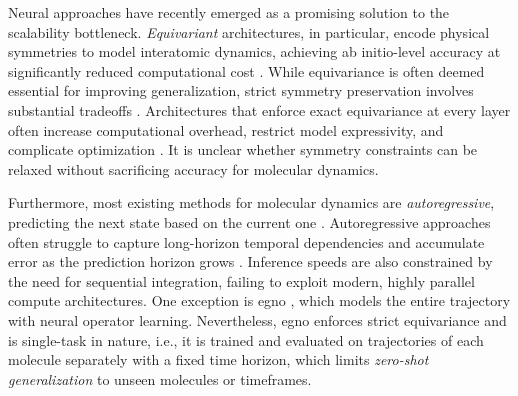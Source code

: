 Neural approaches have recently emerged as a promising solution to the scalability bottleneck. \textit{Equivariant} architectures, in particular, encode physical symmetries to model interatomic dynamics, achieving ab initio-level accuracy at significantly reduced computational cost  \cite{batzner_e3-equivariant_2022, musaelian_learning_2022, batatia_design_2022, batatia_mace_2023, xu_equivariant_2024}. While equivariance is often deemed essential for improving generalization, strict symmetry preservation involves substantial tradeoffs \cite{xu_equivariant_2024, schreiner_implicit_2023}. Architectures that enforce exact equivariance at every layer often increase computational overhead, restrict model expressivity, and complicate optimization \cite{fuchs_se3-transformers_2020, brehmer_geometric_2023, elhag_relaxed_2025}. It is unclear whether symmetry constraints can be relaxed without sacrificing accuracy for molecular dynamics.

Furthermore, most existing methods for molecular dynamics are \textit{autoregressive}, predicting the next state based on the current one \citep{kohler_equivariant_2019,fuchs_se3-transformers_2020,thiemann2025force}.  Autoregressive approaches often struggle to capture long-horizon temporal dependencies and accumulate error as the prediction horizon grows \cite{bengio_scheduled_2015, bergsma_sutranets_2023, taieb_bias_2016}. Inference speeds are also constrained by the need for sequential integration, failing to exploit modern, highly parallel compute architectures. One exception is \gls{egno} \cite{xu_equivariant_2024}, which models the entire trajectory with neural operator learning. Nevertheless, \gls{egno} enforces strict equivariance and is single-task in nature, i.e., it is trained and evaluated on trajectories of each molecule separately with a fixed time horizon, which limits \textit{zero-shot generalization} to unseen molecules or timeframes. 

